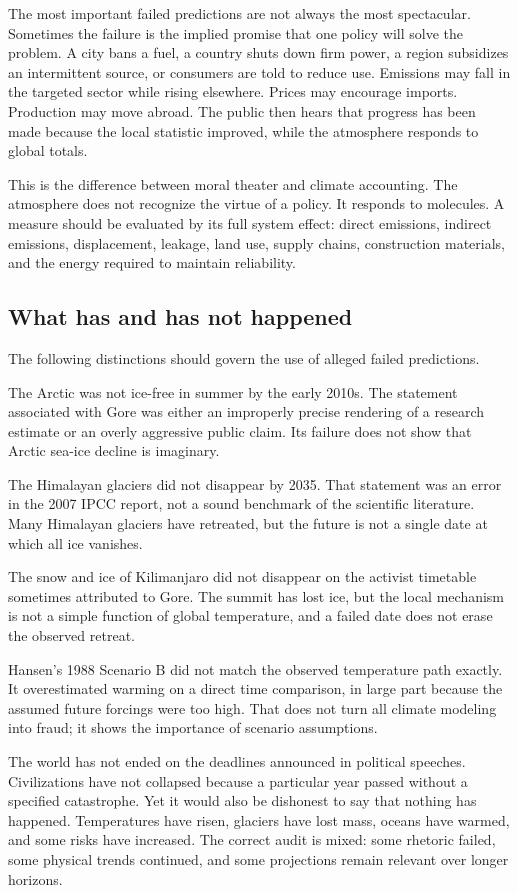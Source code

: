 ﻿\documentclass[12pt,a4paper]{book}
\begin{document}
The most important failed predictions are not always the most spectacular. Sometimes the failure is the implied promise that one policy will solve the problem. A city bans a fuel, a country shuts down firm power, a region subsidizes an intermittent source, or consumers are told to reduce use. Emissions may fall in the targeted sector while rising elsewhere. Prices may encourage imports. Production may move abroad. The public then hears that progress has been made because the local statistic improved, while the atmosphere responds to global totals.

This is the difference between moral theater and climate accounting. The atmosphere does not recognize the virtue of a policy. It responds to molecules. A measure should be evaluated by its full system effect: direct emissions, indirect emissions, displacement, leakage, land use, supply chains, construction materials, and the energy required to maintain reliability.

\subsection{What has and has not happened}
The following distinctions should govern the use of alleged failed predictions.

The Arctic was not ice-free in summer by the early 2010s. The statement associated with Gore was either an improperly precise rendering of a research estimate or an overly aggressive public claim. Its failure does not show that Arctic sea-ice decline is imaginary.

The Himalayan glaciers did not disappear by 2035. That statement was an error in the 2007 IPCC report, not a sound benchmark of the scientific literature. Many Himalayan glaciers have retreated, but the future is not a single date at which all ice vanishes.

The snow and ice of Kilimanjaro did not disappear on the activist timetable sometimes attributed to Gore. The summit has lost ice, but the local mechanism is not a simple function of global temperature, and a failed date does not erase the observed retreat.

Hansen's 1988 Scenario B did not match the observed temperature path exactly. It overestimated warming on a direct time comparison, in large part because the assumed future forcings were too high. That does not turn all climate modeling into fraud; it shows the importance of scenario assumptions.

The world has not ended on the deadlines announced in political speeches. Civilizations have not collapsed because a particular year passed without a specified catastrophe. Yet it would also be dishonest to say that nothing has happened. Temperatures have risen, glaciers have lost mass, oceans have warmed, and some risks have increased. The correct audit is mixed: some rhetoric failed, some physical trends continued, and some projections remain relevant over longer horizons.
\end{document}
